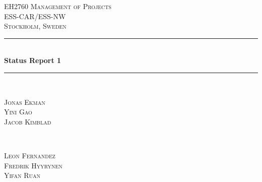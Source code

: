 \documentclass[11pt, titlepage]{article} %
\begin{document}
{} %


\iffalse
\begin{titlepage} %
	\newcommand{\HRule}{\rule{\linewidth}{0.5mm}} %
	
	\center %
	
	
	\textsc{\LARGE EH2760 Management of Projects}\\[1.5cm] %
	
	\textsc{\Large ESS-CAR/ESS-NW}\\[0.5cm] %
	
	\textsc{\large Stockholm, Sweden}\\[0.5cm] %
	
	
	\HRule\\[0.4cm]
	
	{\huge\bfseries Status Report 1}\\[0.4cm] %
	
	\HRule\\[1.5cm]
	
	
	\begin{minipage}{0.4\textwidth}
		\begin{flushleft}
			\large
                        \textsc{Jonas Ekman}
			\\
			\textsc{Yini Gao}
                        \\
                        \textsc{Jacob Kimblad}
		\end{flushleft}
	\end{minipage}
	~
	\begin{minipage}{0.4\textwidth}
		\begin{flushright}
			\large
                        \textsc{Leon Fernandez}
			\\
			\textsc{Fredrik Hyyrynen}
                        \\
                        \textsc{Yifan Ruan}
		\end{flushright}
	\end{minipage}
	

\end{titlepage}
\end{document}
